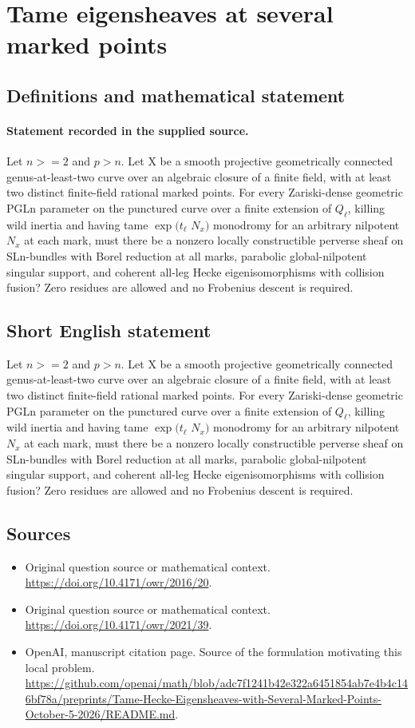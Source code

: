 \documentclass[11pt]{article}
\begin{document}
\section*{Tame eigensheaves at several marked points}\label{30007269}
\subsection{Definitions and mathematical statement}
\paragraph{Statement recorded in the supplied source.}
Let $n>=2$ and $p>n$. Let X be a smooth projective geometrically connected genus-at-least-two curve over an algebraic closure of a finite field, with at least two distinct finite-field rational marked points. For every Zariski-dense geometric PGLn parameter on the punctured curve over a finite extension of $Q_\ell $, killing wild inertia and having tame $\exp (t_\ell $ $N_x)$ monodromy for an arbitrary nilpotent $N_x$ at each mark, must there be a nonzero locally constructible perverse sheaf on SLn-bundles with Borel reduction at all marks, parabolic global-nilpotent singular support, and coherent all-leg Hecke eigenisomorphisms with collision fusion? Zero residues are allowed and no Frobenius descent is required.
\subsection{Short English statement}
Let $n>=2$ and $p>n$. Let X be a smooth projective geometrically connected genus-at-least-two curve over an algebraic closure of a finite field, with at least two distinct finite-field rational marked points. For every Zariski-dense geometric PGLn parameter on the punctured curve over a finite extension of $Q_\ell $, killing wild inertia and having tame $\exp (t_\ell $ $N_x)$ monodromy for an arbitrary nilpotent $N_x$ at each mark, must there be a nonzero locally constructible perverse sheaf on SLn-bundles with Borel reduction at all marks, parabolic global-nilpotent singular support, and coherent all-leg Hecke eigenisomorphisms with collision fusion? Zero residues are allowed and no Frobenius descent is required.
\subsection{Sources}
\begin{itemize}
\item[S1] Original question source or mathematical context.
\url{https://doi.org/10.4171/owr/2016/20}.
\item[S2] Original question source or mathematical context.
\url{https://doi.org/10.4171/owr/2021/39}.
\item[S3] OpenAI, manuscript citation page. Source of the formulation motivating this local problem.
\url{https://github.com/openai/math/blob/adc7f1241b42e322a6451854ab7e4b4c146bf78a/preprints/Tame-Hecke-Eigensheaves-with-Several-Marked-Points-October-5-2026/README.md}.
\end{itemize}
\end{document}

